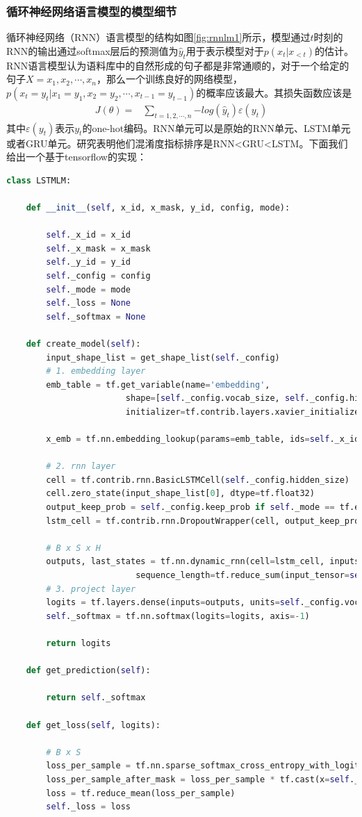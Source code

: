 \documentclass[twoside,a4paper,12pt]{book}%
\begin{document}
\subsubsection{循环神经网络语言模型的模型细节}
循环神经网络（\gls{RNN}）语言模型的结构如图\ref{fig:rnnlm1}所示，模型通过$t$时刻的\gls{RNN}的输出通过softmax层后的预测值为$\hat y_t$用于表示模型对于$p(x_t|x_{<t})$的估计。\gls{RNN}语言模型认为语料库中的自然形成的句子都是非常通顺的，对于一个给定的句子$X = x_1,x_2,\cdots, x_n$，那么一个训练良好的网络模型，$p(x_t=y_t|x_1=y_1,x_2=y_2,\cdots, x_{t-1}=y_{t-1})$的概率应该最大。其损失函数应该是
$$
\begin{aligned}
J(\theta) = & \sum_{t=1,2,\cdots,n}{-log(\hat y_t) \varepsilon (y_t)}
\end{aligned}
$$
其中$\varepsilon(y_t)$表示$y_t$的one-hot编码。\gls{RNN}单元可以是原始的\gls{RNN}单元、\gls{LSTM}单元或者\gls{GRU}单元。研究表明他们混淆度指标排序是\gls{RNN}<\gls{GRU}<\gls{LSTM}。下面我们给出一个基于tensorflow的实现：
\begin{lstlisting}[language={python}]
class LSTMLM:
	
	def __init__(self, x_id, x_mask, y_id, config, mode):
		
		self._x_id = x_id
		self._x_mask = x_mask
		self._y_id = y_id
		self._config = config
		self._mode = mode
		self._loss = None
		self._softmax = None
	
	def create_model(self):
		input_shape_list = get_shape_list(self._config)
		# 1. embedding layer
		emb_table = tf.get_variable(name='embedding',
		                shape=[self._config.vocab_size, self._config.hidden_size],
		                initializer=tf.contrib.layers.xavier_initializer())
		
		x_emb = tf.nn.embedding_lookup(params=emb_table, ids=self._x_id)
		
		# 2. rnn layer
		cell = tf.contrib.rnn.BasicLSTMCell(self._config.hidden_size)
		cell.zero_state(input_shape_list[0], dtype=tf.float32)
		output_keep_prob = self._config.keep_prob if self._mode == tf.estimator.ModeKeys.TRAIN else 1.0
		lstm_cell = tf.contrib.rnn.DropoutWrapper(cell, output_keep_prob=output_keep_prob)
		
		# B x S x H
		outputs, last_states = tf.nn.dynamic_rnn(cell=lstm_cell, inputs=self._x_id,
		                  sequence_length=tf.reduce_sum(input_tensor=self._x_mask, axis=-1, keep_dims=False))
		# 3. project layer
		logits = tf.layers.dense(inputs=outputs, units=self._config.vocab_size, activation=tf.nn.relu, use_bias=True)
		self._softmax = tf.nn.softmax(logits=logits, axis=-1)
		
		return logits
	
	def get_prediction(self):
		
		return self._softmax
	
	def get_loss(self, logits):
		
		# B x S
		loss_per_sample = tf.nn.sparse_softmax_cross_entropy_with_logits(labels=self._y_id, logits=logits)
		loss_per_sample_after_mask = loss_per_sample * tf.cast(x=self._x_mask, dtype=tf.float32)
		loss = tf.reduce_mean(loss_per_sample)
		self._loss = loss
		
 \end{lstlisting}
\end{document}
